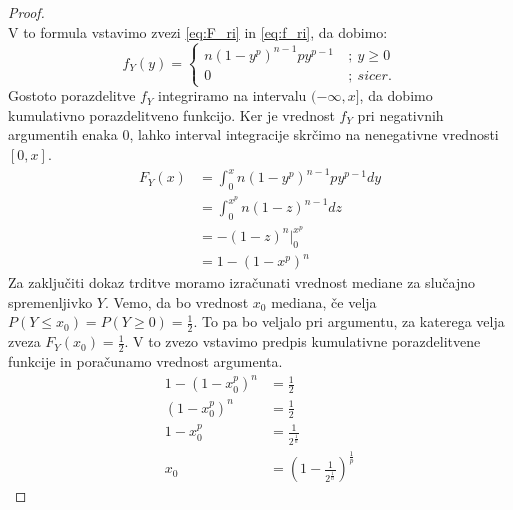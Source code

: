 \documentclass[12pt,a4paper,twoside]{article}
\theoremstyle{definition} %
\theoremstyle{plain} %
\newtheorem{trditev}[definicija]{Trditev}
\numberwithin{equation}{section}  %
\begin{document}
\begin{proof}
\begin{equation*}
	\end{equation*}
	V to formula vstavimo zvezi \ref{eq:F_ri} in \ref{eq:f_ri}, da dobimo:
	\begin{equation}
		f_Y(y) = 
		\begin{cases}
			n(1 - y^p)^{n-1} p y^{p-1}\ &;\ y \geq 0 \\
			0\ &;\ sicer.
		\end{cases} 
	\end{equation}
	Gostoto porazdelitve $f_Y$ integriramo na intervalu $(-\infty,x]$, da dobimo kumulativno porazdelitveno funkcijo.
	Ker je vrednost $f_Y$ pri negativnih argumentih enaka $0$, lahko interval integracije skrčimo na nenegativne vrednosti $[0,x]$.
	\begin{align*}
		F_Y(x) & = \int_0^x n(1 - y^p)^{n-1} p y^{p-1} dy \\
		& = \int_0^{x^p} n(1-z)^{n-1} dz \\
		& = -(1 - z)^n \Big|_0^{x^p} \\
		& = 1 - (1 - x^p)^n
	\end{align*}
	Za zaključiti dokaz trditve moramo izračunati vrednost mediane za slučajno spremenljivko $Y$.
	Vemo, da bo vrednost $x_0$ mediana, če velja $P(Y \leq x_0) = P(Y \geq 0) = \frac{1}{2}$.
	To pa bo veljalo pri argumentu, za katerega velja zveza $F_Y(x_0) = \frac{1}{2}$.
	V to zvezo vstavimo predpis kumulativne porazdelitvene funkcije in poračunamo vrednost argumenta.
	\begin{align*}
		1 - (1 - x_0^p)^n & = \frac{1}{2} \\
		(1 - x_0^p)^n & = \frac{1}{2} \\
		1 - x_0^p & = \frac{1}{2^{\frac{1}{n}}} \\
		x_0 & = (1 - \frac{1}{2^{\frac{1}{n}}})^{\frac{1}{p}}
	\end{align*}
\end{proof}



\end{document}
